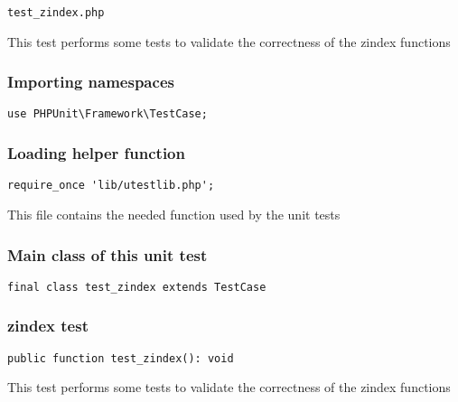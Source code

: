 \documentclass[a4paper]{article}
\begin{document}
\begin{lstlisting}
test_zindex.php
\end{lstlisting}

This test performs some tests to validate the correctness
of the zindex functions

\hypertarget{toc434}{}
\subsubsection{Importing namespaces}

\begin{lstlisting}
use PHPUnit\Framework\TestCase;
\end{lstlisting}

\hypertarget{toc435}{}
\subsubsection{Loading helper function}

\begin{lstlisting}
require_once 'lib/utestlib.php';
\end{lstlisting}

This file contains the needed function used by the unit tests

\hypertarget{toc436}{}
\subsubsection{Main class of this unit test}

\begin{lstlisting}
final class test_zindex extends TestCase
\end{lstlisting}

\hypertarget{toc437}{}
\subsubsection{zindex test}

\begin{lstlisting}
public function test_zindex(): void
\end{lstlisting}

This test performs some tests to validate the correctness
of the zindex functions

\end{document}
